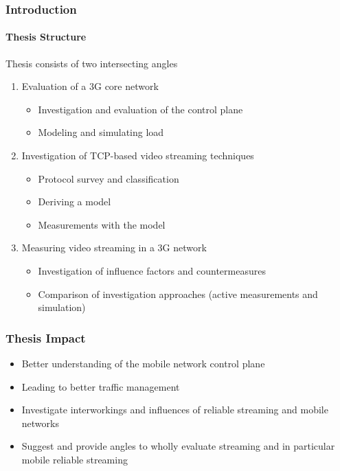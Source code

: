 \documentclass{beamer}
\begin{document}
\begin{frame}
	\frametitle{Introduction}
	\framesubtitle{Thesis Structure}

	Thesis consists of two intersecting angles
	\begin{enumerate}
		\item Evaluation of a 3G core network
			\begin{itemize}
				\item Investigation and evaluation of the control plane
				\item Modeling and simulating load
			\end{itemize}

		\item<2-> Investigation of TCP-based video streaming techniques
			\begin{itemize}[<2->]
				\item Protocol survey and classification
				\item Deriving a model
				\item Measurements with the model
			\end{itemize}

		\item<3-> Measuring video streaming in a 3G network 
			\begin{itemize}[<3->]
				\item Investigation of influence factors and countermeasures
				\item Comparison of investigation approaches (active measurements and simulation)
			\end{itemize}
	\end{enumerate}


\end{frame}


\begin{frame}
	\frametitle{Thesis Impact}

	\begin{itemize}
		\item Better understanding of the mobile network control plane
		\item Leading to better traffic management
		\item Investigate interworkings and influences of reliable streaming and mobile networks
		\item Suggest and provide angles to wholly evaluate streaming and in particular mobile reliable streaming
	\end{itemize}
\end{frame}
\end{document}
